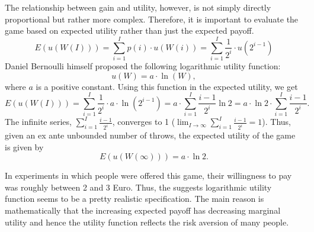 \documentclass[
  12pt,
  oneside]{book}
\theoremstyle{definition}
\theoremstyle{definition}
\theoremstyle{definition}
\theoremstyle{definition}
\theoremstyle{remark}
\begin{document}
The relationship between gain and utility, however, is not simply directly proportional but rather more complex. Therefore, it is important to evaluate the game based on expected utility rather than just the expected payoff.
\[
E(u(W(I)))=\sum_{i=1}^{I} p(i) \cdot u(W(i))=\sum_{i=1}^{I} \frac{1}{2^{i}} \cdot u\left(2^{i-1}\right)
\]
Daniel Bernoulli himself proposed the following logarithmic utility function:
\[
u(W)=a \cdot \ln (W),
\]
where \(a\) is a positive constant. Using this function in the expected utility, we get
\[
E(u(W(I)))=\sum_{i=1}^{I} \frac{1}{2^{i}} \cdot a \cdot \ln \left(2^{i-1}\right)=a \cdot \sum_{i=1}^{I} \frac{i-1}{2^{i}} \ln 2=a \cdot \ln 2 \cdot \sum_{i=1}^{I} \frac{i-1}{2^{i}}.
\]
The infinite series, \(\sum_{i=1}^{I} \frac{i-1}{2^{i}}\), converges to 1 (\(\lim _{I \rightarrow \infty} \sum_{i=1}^{I} \frac{i-1}{2^{i}}=1\)). Thus, given an ex ante unbounded number of throws, the expected utility of the game is given by
\[
E(u(W(\infty)))=a \cdot \ln 2 .
\]

In experiments in which people were offered this game, their willingness to pay was roughly between 2 and 3 Euro. Thus, the suggests logarithmic utility function seems to be a pretty realistic specification.
The main reason is mathematically that the increasing expected payoff has decreasing marginal utility and hence the utility function reflects the risk aversion of many people.
\end{document}
